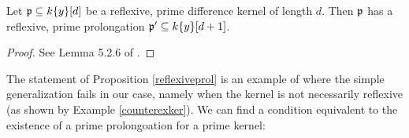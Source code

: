 \begin{prop}\label{reflexiveprol}
Let $\mathfrak{p} \subseteq k\{y\}[d]$ be a reflexive, prime difference kernel of length $d$. Then $\mathfrak{p}$ has a reflexive, prime prolongation $\mathfrak{p}' \subseteq k\{y\}[d+1]$.
\begin{proof}
See Lemma 5.2.6 of \cite{wibmer}.
\end{proof}
\end{prop}

The statement of Proposition \ref{reflexiveprol} is an example of where the simple generalization fails in our case, namely when the kernel is not necessarily reflexive (as shown by Example \ref{counterexker}). We can find a condition equivalent to the existence of a prime prolongoation for a prime kernel:


